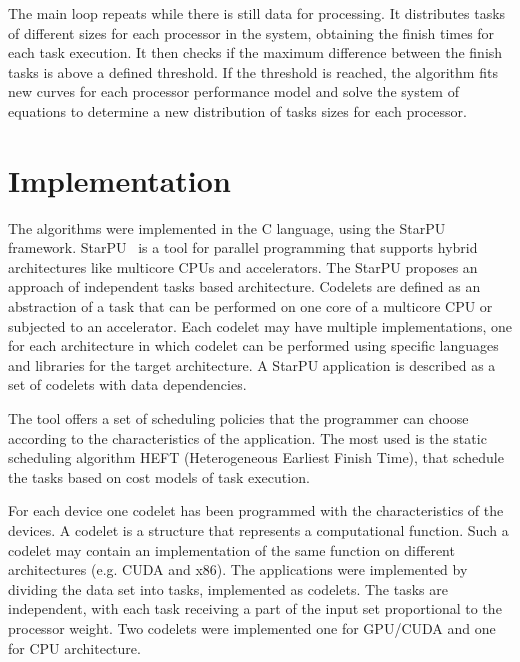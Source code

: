 \documentclass[journal]{IEEEtran}
\begin{document}


The main loop repeats while there is still data for processing. It distributes
tasks of different sizes for each processor in the system, obtaining the finish
times for each task execution. It then checks if the maximum difference between
the finish tasks is above a defined threshold. If the threshold is reached, the
algorithm fits new curves for each processor performance model and solve the
system of equations to determine a new distribution of tasks sizes for each
processor.


\section{Implementation}

The algorithms were implemented in the C language, using the StarPU framework.
StarPU~\cite{starpu} is a tool for parallel programming that supports hybrid
architectures like multicore CPUs and accelerators. The StarPU proposes an
approach of independent tasks based architecture. Codelets are defined as an
abstraction of a task that can be performed on one core of a multicore CPU or
subjected to an accelerator. Each codelet may have multiple implementations, one
for each architecture in which codelet can be performed using specific languages
and libraries for the target architecture. A StarPU application is described as
a set of codelets with data dependencies.

The tool offers a set of scheduling policies that the programmer can
choose according to the characteristics of the application. The most used is the static scheduling algorithm HEFT (Heterogeneous Earliest Finish Time), that
schedule the tasks based on cost models of task execution.

For each device one codelet has been programmed with the characteristics of the
devices. A codelet is a structure that represents a computational function. Such a
codelet may contain an implementation of the same function on different
architectures (e.g. CUDA and x86).  The applications were implemented by
dividing the data set into tasks, implemented as codelets. The tasks are
independent, with each task receiving a part of the input set proportional to
the processor weight. Two codelets were implemented one for GPU/CUDA and one for
CPU architecture.
\end{document}

